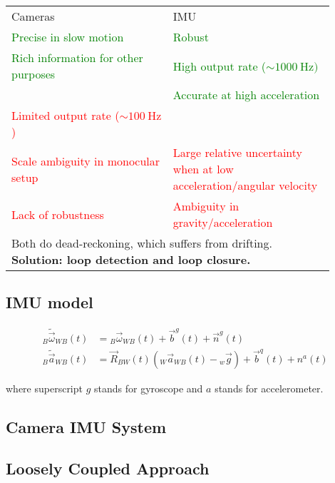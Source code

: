 \documentclass[10pt,a4paper]{scrartcl}
\begin{document}
\begin{multicols*}{2}
\begin{tabular}{p{0.45\linewidth}p{0.45\linewidth}}
Cameras&IMU\\
\textcolor{green}{Precise in slow motion}&\textcolor{green}{Robust}\\
\textcolor{green}{Rich information for other purposes}&\textcolor{green}{High output rate ($\sim\SI{1000}{\hertz})$}\\
&\textcolor{green}{Accurate at high acceleration}\\
\textcolor{red}{Limited output rate ($\sim\SI{100}{\hertz}$)}&\\
\textcolor{red}{Scale ambiguity in monocular setup}&\textcolor{red}{Large relative uncertainty when at low acceleration/angular velocity}\\
\textcolor{red}{Lack of robustness}&\textcolor{red}{Ambiguity in gravity/acceleration}\\
\multicolumn{2}{p{\linewidth}}{Both do dead-reckoning, which suffers from drifting. \textbf{Solution: loop detection and loop closure.}}
\end{tabular}

\subsection{IMU model}

\begin{align*}
{}_B\tilde{\vec{\omega}}_{WB}(t)&={}_B\vec{\omega}_{WB}(t)+\vec{b}^g(t)+\vec{n}^g(t)\\
{}_B\tilde{\vec{a}}_{WB}(t)&=\vec{R}_{BW}(t)({}_W\vec{a}_{WB}(t)-{}_w\vec{g})+\vec{b}^q(t)+n^a(t)
\end{align*}

where superscript $g$ stands for gyroscope and $a$ stands for accelerometer.


\subsection{Camera IMU System}



\subsection{Loosely Coupled Approach}


\end{multicols*}
\end{document}
